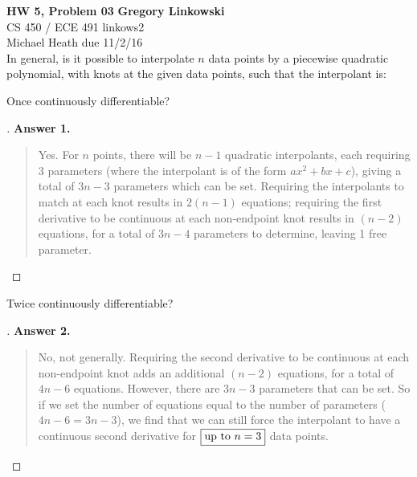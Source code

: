 \documentclass[12pt]{article}
\newenvironment{exercise}[2][Exercise]{\begin{trivlist}
\item[\hskip \labelsep {\bfseries #1}\hskip \labelsep {\bfseries #2.}]}{\end{trivlist}}
\begin{document}
\noindent
\large\textbf{HW 5, Problem 03} \hfill \textbf{Gregory Linkowski} \\
\normalsize CS 450 / ECE 491 \hfill linkows2 \\
Michael Heath \hfill due 11/2/16 \\


\vspace{5mm}
In general, is it possible to interpolate $n$ data points by a piecewise quadratic polynomial, with knots at the given data points, such that the interpolant is:
\vspace{-2mm} \\

\begin{exercise}{1}
	Once continuously differentiable?
\end{exercise} %
\begin{proof}[]
	\textbf{Answer 1.} %
	\begin{quote}
		Yes. For $n$ points, there will be $n-1$ quadratic interpolants, each requiring $3$ parameters (where the interpolant is of the form $ax^2 + bx + c$), giving a total of $3n-3$ parameters which can be set. Requiring the interpolants to match at each knot results in $2(n-1)$ equations; requiring the first derivative to be continuous at each non-endpoint knot results in $(n-2)$ equations, for a total of $3n-4$ parameters to determine, leaving 1 free parameter.
	\end{quote}
\end{proof}

\begin{exercise}{2}
	Twice continuously differentiable?
\end{exercise} %
\begin{proof}[]
	\textbf{Answer 2.} %
	\begin{quote}
		No, not generally. Requiring the second derivative to be continuous at each non-endpoint knot adds an additional $(n-2)$ equations, for a total of $4n-6$ equations. However, there are $3n-3$ parameters that can be set. So if we set the number of equations equal to the number of parameters ($4n-6 = 3n-3$), we find that we can still force the interpolant to have a continuous second derivative for  $\boxed{\textnormal{up to }n=3}$ data points.
	\end{quote}
\end{proof}
\end{document}
